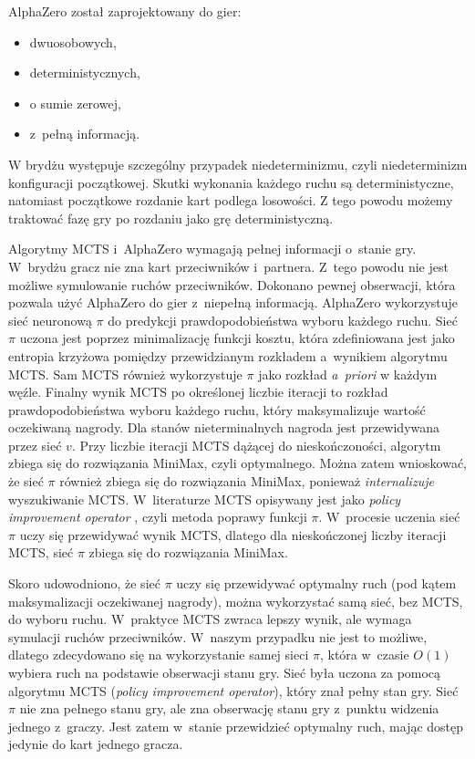 AlphaZero został zaprojektowany do gier:
\begin{itemize}
  \item dwuosobowych,
  \item deterministycznych,
  \item o sumie zerowej,
  \item z~pełną informacją.
\end{itemize}

W brydżu występuje szczególny przypadek niedeterminizmu,
czyli niedeterminizm konfiguracji początkowej.
Skutki wykonania każdego ruchu są deterministyczne,
natomiast początkowe rozdanie kart podlega losowości.
Z tego powodu możemy traktować fazę gry po rozdaniu jako
grę deterministyczną.

Algorytmy MCTS i~AlphaZero wymagają pełnej informacji o~stanie gry.
W~brydżu gracz nie zna kart przeciwników i~partnera.
Z~tego powodu nie jest możliwe symulowanie ruchów przeciwników.
Dokonano pewnej obserwacji, która pozwala użyć AlphaZero do gier
z~niepełną informacją.
AlphaZero wykorzystuje sieć neuronową $\pi$ do predykcji
prawdopodobieństwa wyboru każdego ruchu.
Sieć $\pi$ uczona jest poprzez minimalizację funkcji kosztu,
która zdefiniowana jest jako entropia krzyżowa pomiędzy
przewidzianym rozkładem a~wynikiem algorytmu MCTS.
Sam MCTS również wykorzystuje $\pi$ jako rozkład
\textit{a~priori} w każdym węźle.
Finalny wynik MCTS po określonej liczbie iteracji
to rozkład prawdopodobieństwa wyboru każdego ruchu,
który maksymalizuje wartość oczekiwaną nagrody.
Dla stanów nieterminalnych nagroda jest przewidywana
przez sieć $v$.
Przy liczbie iteracji MCTS dążącej do nieskończoności,
algorytm zbiega się do rozwiązania MiniMax, czyli optymalnego.
Można zatem wnioskować, że sieć $\pi$ również zbiega się
do rozwiązania MiniMax, ponieważ \textit{internalizuje}
wyszukiwanie MCTS. W~literaturze MCTS opisywany jest jako
\textit{policy improvement operator} \cite{MuZeroPaper,EfficientZeroPaper},
czyli metoda poprawy funkcji $\pi$.
W~procesie uczenia sieć $\pi$ uczy się przewidywać wynik MCTS,
dlatego dla nieskończonej liczby iteracji MCTS,
sieć $\pi$ zbiega się do rozwiązania MiniMax.

Skoro udowodniono, że sieć $\pi$ uczy się przewidywać
optymalny ruch (pod kątem maksymalizacji oczekiwanej nagrody),
można wykorzystać samą sieć, bez MCTS, do wyboru ruchu.
W~praktyce MCTS zwraca lepszy wynik, ale wymaga
symulacji ruchów przeciwników.
W~naszym przypadku nie jest to możliwe, dlatego
zdecydowano się na wykorzystanie samej sieci $\pi$,
która w~czasie $O(1)$ wybiera ruch na podstawie obserwacji stanu gry.
Sieć była uczona za pomocą algorytmu MCTS (\textit{policy improvement operator}),
który znał pełny stan gry.
Sieć $\pi$ nie zna pełnego stanu gry, ale zna obserwację stanu gry
z~punktu widzenia jednego z~graczy.
Jest zatem w~stanie przewidzieć optymalny ruch,
mając dostęp jedynie do kart jednego gracza.

